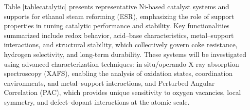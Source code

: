 Table \ref{tablecatalytic} presents representative Ni-based catalyst systems and supports for ethanol steam reforming (ESR), emphasizing the role of support properties in tuning catalytic performance and stability. Key functionalities summarized include redox behavior, acid–base characteristics, metal–support interactions, and structural stability, which collectively govern coke resistance, hydrogen selectivity, and long-term durability. These systems will be investigated using advanced characterization techniques: in situ/operando X-ray absorption spectroscopy (XAFS), enabling the analysis of oxidation states, coordination environments, and metal–support interactions, and Perturbed Angular Correlation (PAC), which provides unique sensitivity to oxygen vacancies, local symmetry, and defect–dopant interactions at the atomic scale.


